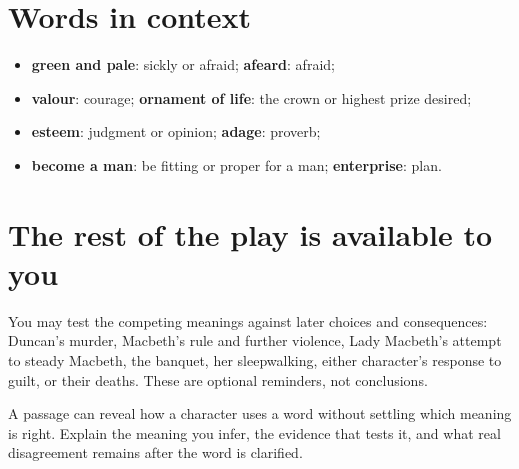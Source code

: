 \documentclass[11pt]{article}
\begin{document}
\section*{Words in context}
\begin{itemize}
\item \textbf{green and pale}: sickly or afraid; \textbf{afeard}: afraid;
\item \textbf{valour}: courage; \textbf{ornament of life}: the crown or highest prize desired;
\item \textbf{esteem}: judgment or opinion; \textbf{adage}: proverb;
\item \textbf{become a man}: be fitting or proper for a man; \textbf{enterprise}: plan.
\end{itemize}

\section*{The rest of the play is available to you}
You may test the competing meanings against later choices and consequences: Duncan's murder, Macbeth's rule and further violence, Lady Macbeth's attempt to steady Macbeth, the banquet, her sleepwalking, either character's response to guilt, or their deaths. These are optional reminders, not conclusions.

A passage can reveal how a character uses a word without settling which meaning is right. Explain the meaning you infer, the evidence that tests it, and what real disagreement remains after the word is clarified.
\end{document}

